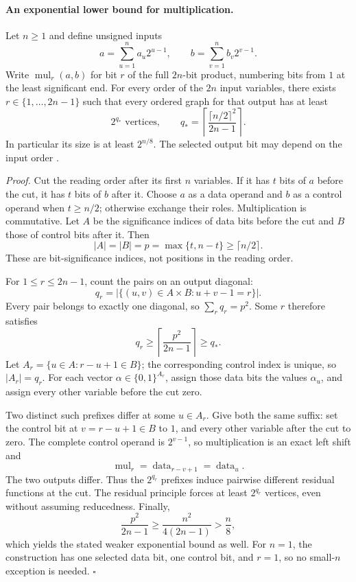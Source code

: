 \paragraph{An exponential lower bound for multiplication.}
Let \(n\geq1\) and define unsigned inputs
\[
 a=\sum_{u=1}^{n}a_u2^{u-1},\qquad
 b=\sum_{v=1}^{n}b_v2^{v-1}.
\]
Write \(\operatorname{mul}_r(a,b)\) for bit \(r\) of the full
\(2n\)-bit product, numbering bits from \(1\) at the least
significant end. For every order of the \(2n\) input variables,
there exists \(r\in\{1,\ldots,2n-1\}\) such that every ordered
graph for that output has at least
\[
 2^{q_*}\text{ vertices},\qquad
 q_*=\left\lceil
       \frac{\lceil n/2\rceil^2}{2n-1}
      \right\rceil.
\]
In particular its size is at least \(2^{n/8}\). The selected
output bit may depend on the input order
\cite[app., thm.~2 and lem.~4]{Bryant1986}.

\emph{Proof.}
Cut the reading order after its first \(n\) variables.
If it has \(t\) bits of \(a\) before the cut, it has \(t\)
bits of \(b\) after it. Choose \(a\) as a data operand and
\(b\) as a control operand when \(t\geq n/2\); otherwise
exchange their roles. Multiplication is commutative.
Let \(A\) be the significance indices of data bits before
the cut and \(B\) those of control bits after it. Then
\[
 |A|=|B|=p=\max\{t,n-t\}\geq\lceil n/2\rceil.
\]
These are bit-significance indices, not positions in the
reading order.

For \(1\leq r\leq2n-1\), count the pairs on an output diagonal:
\[
 q_r=|\{(u,v)\in A\times B:u+v-1=r\}|.
\]
Every pair belongs to exactly one diagonal, so
\(\sum_rq_r=p^2\). Some \(r\) therefore satisfies
\[
 q_r\geq\left\lceil\frac{p^2}{2n-1}\right\rceil
       \geq q_*.
\]
Let \(A_r=\{u\in A:r-u+1\in B\}\); the corresponding
control index is unique, so \(|A_r|=q_r\).
For each vector \(\alpha\in\{0,1\}^{A_r}\), assign those
data bits the values \(\alpha_u\), and assign every other
variable before the cut zero.

Two distinct such prefixes differ at some \(u\in A_r\).
Give both the same suffix: set the control bit at
\(v=r-u+1\in B\) to \(1\), and every other variable after
the cut to zero. The complete control operand is
\(2^{v-1}\), so multiplication is an exact left shift and
\[
 \operatorname{mul}_r=\operatorname{data}_{r-v+1}
                    =\operatorname{data}_u.
\]
The two outputs differ. Thus the \(2^{q_r}\) prefixes
induce pairwise different residual functions at the cut.
The residual principle forces at least \(2^{q_r}\)
vertices, even without assuming reducedness.
Finally,
\[
 \frac{p^2}{2n-1}
  \geq\frac{n^2}{4(2n-1)}>\frac n8,
\]
which yields the stated weaker exponential bound as well.
For \(n=1\), the construction has one selected data bit,
one control bit, and \(r=1\), so no small-\(n\) exception
is needed. \(\square\)

